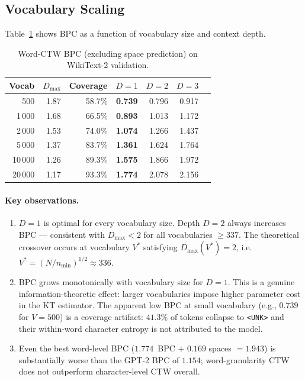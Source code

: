 \documentclass[11pt,a4paper]{article}
\newcommand{\dmax}{D_{\max}}
\begin{document}
\subsection{Vocabulary Scaling}
\label{ssec:vocab_scale}

Table~\ref{tab:word_scaling} shows BPC as a function of vocabulary size
and context depth.

\begin{table}[H]
\centering
\caption{Word-CTW BPC (excluding space prediction) on WikiText-2 validation.}
\label{tab:word_scaling}
{\small\setlength{\tabcolsep}{5pt}
\begin{tabular}{rrrrrrr}
\toprule
\textbf{Vocab} & \textbf{$\dmax$} & \textbf{Coverage} &
\textbf{$D=1$} & \textbf{$D=2$} & \textbf{$D=3$} \\
\midrule
500    & 1.87 & 58.7\% & \textbf{0.739} & 0.796 & 0.917 \\
1\,000 & 1.68 & 66.5\% & \textbf{0.893} & 1.013 & 1.172 \\
2\,000 & 1.53 & 74.0\% & \textbf{1.074} & 1.266 & 1.437 \\
5\,000 & 1.37 & 83.7\% & \textbf{1.361} & 1.624 & 1.764 \\
10\,000& 1.26 & 89.3\% & \textbf{1.575} & 1.866 & 1.972 \\
20\,000& 1.17 & 93.3\% & \textbf{1.774} & 2.078 & 2.156 \\
\bottomrule
\end{tabular}}
\end{table}

\paragraph{Key observations.}
\begin{enumerate}[leftmargin=1.5em]
  \item $D=1$ is optimal for every vocabulary size.
        Depth $D=2$ always increases BPC — consistent with
        $\dmax < 2$ for all vocabularies $\ge 337$.
        The theoretical crossover occurs at vocabulary $V^*$ satisfying
        $\dmax(V^*) = 2$, i.e.\ $V^* = (N/n_{\min})^{1/2} \approx 336$.

  \item BPC grows monotonically with vocabulary size for $D=1$.
        This is a genuine information-theoretic effect:
        larger vocabularies impose higher parameter cost in the KT estimator.
        The apparent low BPC at small vocabulary (e.g., $0.739$ for $V=500$)
        is a coverage artifact: $41.3\%$ of tokens collapse to \texttt{<UNK>}
        and their within-word character entropy is not attributed to the model.

  \item Even the best word-level BPC ($1.774$~BPC $+$ $0.169$ spaces $= 1.943$)
        is substantially worse than the GPT-2 BPC of $1.154$;
        word-granularity CTW does not outperform character-level CTW overall.
\end{enumerate}
\end{document}
